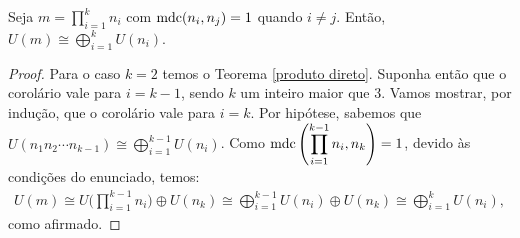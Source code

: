 	\begin{corollary}
	\label{produto direto de U(m)}
		Seja $\displaystyle{m = \prod_{i = 1}^{k}n_i}$ com 
		$\operatorname{mdc}(n_i, n_j) = 1$ quando $i\neq j$. Então,
		$\displaystyle{U(m)\cong\bigoplus_{i = 1}^{k} U(n_i)}$.
	\end{corollary}
	\begin{proof}
		Para o caso $k = 2$ temos o Teorema \ref{produto direto}. Suponha então que o corolário 
		vale para $i = k-1$, sendo $k$ um inteiro maior que 3. Vamos mostrar, por indução, que o 
		corolário vale para $i = k$.
		Por hipótese, sabemos que $U(n_1n_2\cdots n_{k-1})\cong \displaystyle{\bigoplus_{i=1}^{k-1}U(n_i)}$. 
		Como $\operatorname{mdc} \Bigg(\displaystyle{ \prod_{i=1}^{k-1}n_i }, n_k\Bigg) = 1$, devido às condições do 
		enunciado, temos:
		\begin{align*}
		U(m) \cong U\Bigg(\displaystyle{\prod_{i=1}^{k-1}n_i}\Bigg)\oplus U(n_k)
		     \cong \bigoplus_{i=1}^{k-1}U(n_i)\oplus U(n_k)
		     \cong \bigoplus_{i=1}^{k}U(n_i),
		\end{align*}
		como afirmado.
	\end{proof}

